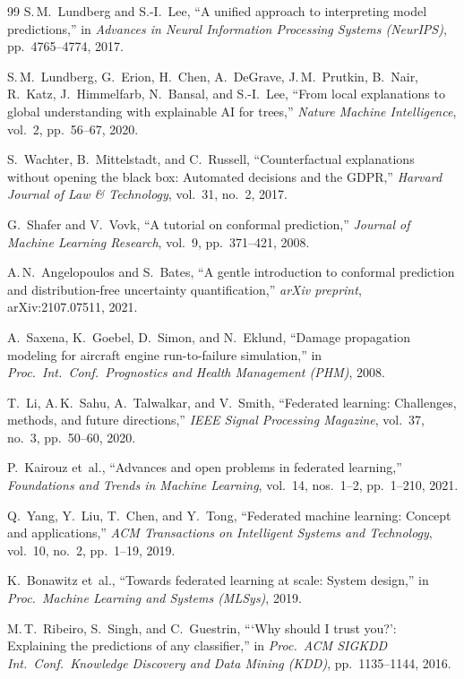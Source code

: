 \documentclass[10pt, journal, letterpaper]{IEEEtran}
\begin{document}
\begin{thebibliography}{99}
S.\,M.~Lundberg and S.-I.~Lee,
``A unified approach to interpreting model predictions,''
in \emph{Advances in Neural Information Processing Systems (NeurIPS)},
pp.~4765--4774, 2017.

S.\,M.~Lundberg, G.~Erion, H.~Chen, A.~DeGrave, J.\,M.~Prutkin,
B.~Nair, R.~Katz, J.~Himmelfarb, N.~Bansal, and S.-I.~Lee,
``From local explanations to global understanding with explainable AI for
trees,'' \emph{Nature Machine Intelligence}, vol.~2, pp.~56--67, 2020.

S.~Wachter, B.~Mittelstadt, and C.~Russell,
``Counterfactual explanations without opening the black box: Automated
decisions and the GDPR,''
\emph{Harvard Journal of Law \& Technology}, vol.~31, no.~2, 2017.

G.~Shafer and V.~Vovk,
``A tutorial on conformal prediction,''
\emph{Journal of Machine Learning Research}, vol.~9, pp.~371--421, 2008.

A.\,N.~Angelopoulos and S.~Bates,
``A gentle introduction to conformal prediction and distribution-free
uncertainty quantification,''
\emph{arXiv preprint}, arXiv:2107.07511, 2021.

A.~Saxena, K.~Goebel, D.~Simon, and N.~Eklund,
``Damage propagation modeling for aircraft engine run-to-failure simulation,''
in \emph{Proc.\ Int.\ Conf.\ Prognostics and Health Management (PHM)}, 2008.

T.~Li, A.\,K.~Sahu, A.~Talwalkar, and V.~Smith,
``Federated learning: Challenges, methods, and future directions,''
\emph{IEEE Signal Processing Magazine}, vol.~37, no.~3, pp.~50--60, 2020.

P.~Kairouz et~al.,
``Advances and open problems in federated learning,''
\emph{Foundations and Trends in Machine Learning},
vol.~14, nos.~1--2, pp.~1--210, 2021.

Q.~Yang, Y.~Liu, T.~Chen, and Y.~Tong,
``Federated machine learning: Concept and applications,''
\emph{ACM Transactions on Intelligent Systems and Technology},
vol.~10, no.~2, pp.~1--19, 2019.

K.~Bonawitz et~al.,
``Towards federated learning at scale: System design,''
in \emph{Proc.\ Machine Learning and Systems (MLSys)}, 2019.

M.\,T.~Ribeiro, S.~Singh, and C.~Guestrin,
```Why should I trust you?': Explaining the predictions of any classifier,''
in \emph{Proc.\ ACM SIGKDD Int.\ Conf.\ Knowledge Discovery and Data Mining
(KDD)}, pp.~1135--1144, 2016.


\end{thebibliography}
\end{document}
